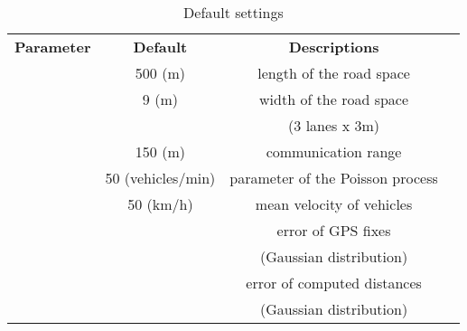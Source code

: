 \documentclass[letterpaper, 10 pt, conference]{ieeeconf}
\begin{document}
\begin {table}
\renewcommand{\arraystretch}{1.3}
\centering \caption{Default settings} \label{table:settings}
\begin{tabular}{|l|l|l|l}
\cline{1-3}
\multicolumn{1}{|c|}{\textbf{Parameter}} & \multicolumn{1}{c|}{\textbf{Default}} & \multicolumn{1}{c|}{\textbf{Descriptions}} &  \\
\cline{1-3}
\multicolumn{1}{|c|}{} & \multicolumn{1}{c|}{500 (m)} & \multicolumn{1}{c|}{length of the road space} &  \\
\cline{1-3}
\multicolumn{1}{|c|}{} & \multicolumn{1}{c|}{9 (m)} & \multicolumn{1}{c|}{width of the road space} &  \\
\multicolumn{1}{|c|}{} & \multicolumn{1}{c|}{} & \multicolumn{1}{c|}{(3 lanes x 3m)} &  \\
\cline{1-3}
\multicolumn{1}{|c|}{} & \multicolumn{1}{c|}{150 (m)} & \multicolumn{1}{c|}{communication range} &  \\
\cline{1-3}
\multicolumn{1}{|c|}{} & \multicolumn{1}{c|}{50 (vehicles/min)} & \multicolumn{1}{c|}{parameter of the Poisson process} &  \\
\cline{1-3}
\multicolumn{1}{|c|}{} & \multicolumn{1}{c|}{50 (km/h)} & \multicolumn{1}{c|}{mean velocity of vehicles} &  \\
\cline{1-3}
\multicolumn{1}{|c|}{} & \multicolumn{1}{c|}{} & \multicolumn{1}{c|}{error of GPS fixes} &  \\
\multicolumn{1}{|c|}{} & \multicolumn{1}{c|}{} & \multicolumn{1}{c|}{(Gaussian distribution)} &  \\
\cline{1-3}
\multicolumn{1}{|c|}{} & \multicolumn{1}{c|}{} & \multicolumn{1}{c|}{error of computed distances} &  \\
\multicolumn{1}{|c|}{} & \multicolumn{1}{c|}{} & \multicolumn{1}{c|}{(Gaussian distribution)} &  \\
\cline{1-3}
\end{tabular}
\end{table}
\end{document}
